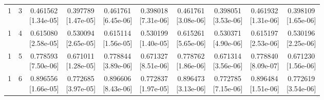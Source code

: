 \documentclass[12pt,letterpaper]{article}
\theoremstyle{plain}
\theoremstyle{definition}
\begin{document}
\begin{table}[p]
\begin{adjustbox}{max width=\linewidth}
\begin{tabular}{@{}rr*{8}{c}@{}}
1 & 3 & \shortstack{0.461562\\[-1pt]{\scriptsize[1.34e-05]}} & \shortstack{0.397789\\[-1pt]{\scriptsize[1.47e-05]}} & \shortstack{0.461761\\[-1pt]{\scriptsize[6.45e-06]}} & \shortstack{0.398018\\[-1pt]{\scriptsize[7.31e-06]}} & \shortstack{0.461761\\[-1pt]{\scriptsize[3.08e-06]}} & \shortstack{0.398051\\[-1pt]{\scriptsize[3.53e-06]}} & \shortstack{0.461932\\[-1pt]{\scriptsize[1.31e-06]}} & \shortstack{0.398109\\[-1pt]{\scriptsize[1.65e-06]}}\\
1 & 4 & \shortstack{0.615080\\[-1pt]{\scriptsize[2.58e-05]}} & \shortstack{0.530094\\[-1pt]{\scriptsize[2.65e-05]}} & \shortstack{0.615114\\[-1pt]{\scriptsize[1.56e-05]}} & \shortstack{0.530199\\[-1pt]{\scriptsize[1.40e-05]}} & \shortstack{0.615261\\[-1pt]{\scriptsize[5.65e-06]}} & \shortstack{0.530371\\[-1pt]{\scriptsize[4.90e-06]}} & \shortstack{0.615197\\[-1pt]{\scriptsize[2.53e-06]}} & \shortstack{0.530196\\[-1pt]{\scriptsize[2.25e-06]}}\\
1 & 5 & \shortstack{0.778593\\[-1pt]{\scriptsize[7.50e-06]}} & \shortstack{0.671011\\[-1pt]{\scriptsize[1.28e-05]}} & \shortstack{0.778844\\[-1pt]{\scriptsize[3.89e-06]}} & \shortstack{0.671327\\[-1pt]{\scriptsize[8.51e-06]}} & \shortstack{0.778762\\[-1pt]{\scriptsize[1.86e-06]}} & \shortstack{0.671314\\[-1pt]{\scriptsize[3.56e-06]}} & \shortstack{0.778840\\[-1pt]{\scriptsize[8.09e-07]}} & \shortstack{0.671230\\[-1pt]{\scriptsize[1.56e-06]}}\\
1 & 6 & \shortstack{0.896556\\[-1pt]{\scriptsize[1.66e-05]}} & \shortstack{0.772685\\[-1pt]{\scriptsize[3.97e-05]}} & \shortstack{0.896606\\[-1pt]{\scriptsize[8.43e-06]}} & \shortstack{0.772837\\[-1pt]{\scriptsize[1.97e-05]}} & \shortstack{0.896473\\[-1pt]{\scriptsize[3.13e-06]}} & \shortstack{0.772785\\[-1pt]{\scriptsize[7.15e-06]}} & \shortstack{0.896484\\[-1pt]{\scriptsize[1.51e-06]}} & \shortstack{0.772619\\[-1pt]{\scriptsize[3.54e-06]}}\\

\end{tabular}
\end{adjustbox}
\end{table}
\end{document}
